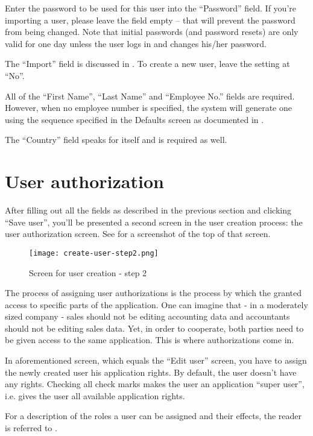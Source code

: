 Enter the password to be used for this user into the ``Password'' field. If you're
importing a user, please leave the field empty -- that will prevent the password
from being changed.  Note that initial passwords (and password resets) are only 
valid for one day unless the user logs in and changes his/her password.

The ``Import'' field is discussed in . To create a new
user, leave the setting at ``No''.

All of the ``First Name'', ``Last Name'' and ``Employee No.'' fields are required.
However, when no employee number is specified, the system will generate one using
the sequence specified in the Defaults screen as documented in
.

The ``Country'' field speaks for itself and is required as well.


\section{User authorization}
\label{sec-user-management-authorization}

After filling out all the fields as described in the previous section and
clicking ``Save user'', you'll be presented
a second screen in the user creation process: the user authorization screen.
See  for a screenshot of the top of that screen.

\begin{figure}[h]
\texttt{[image: create-user-step2.png]}
\caption{Screen for user creation - step 2}
\label{fig:create-user-step2}
\end{figure}


The process of assigning user authorizations is the process by which the granted
access to specific parts of the application. One can imagine that - in a moderately
sized company - sales should not be editing accounting data and accountants should
not be editing sales data. Yet, in order to cooperate, both parties need to be
given access to the same application. This is where authorizations come in.

In aforementioned screen, which equals the ``Edit user'' screen, you have to assign the
newly created user his application rights. By default, the user doesn't have any
rights. Checking all check marks makes the user an application ``super user'', i.e.
gives the user all available application rights.

For a description of the roles a user can be assigned and their effects, the
reader is referred to .


